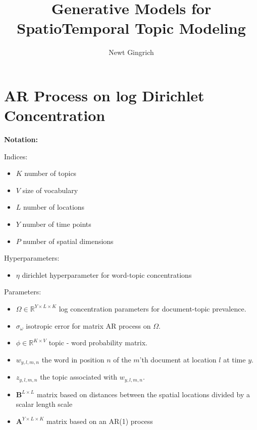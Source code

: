 \documentclass[a4paper]{article}
\title{Generative Models for SpatioTemporal Topic Modeling}
\author{Newt Gingrich}
\begin{document}
\maketitle

\section{AR Process on log Dirichlet Concentration}

\textbf{Notation:}

Indices:
\begin{itemize}
    \item $K$ number of topics
    \item $V$ size of vocabulary
    \item $L$ number of locations
    \item $Y$ number of time points
    \item $P$ number of spatial dimensions
\end{itemize}

Hyperparameters:
\begin{itemize}
    \item $\eta$ dirichlet hyperparameter for word-topic concentrations
\end{itemize}

Parameters:
\begin{itemize}
    \item $\Omega \in \mathbb{R}^{Y\times L\times K}$ log concentration parameters for document-topic prevalence.
    \item $\sigma_{\omega}$ isotropic error for matrix AR process on $\Omega$.
    \item $\phi \in \mathbb{R}^{K\times V}$ topic - word probability matrix.
    \item $w_{y,l,m,n}$ the word in position $n$ of the $m$'th document at location $l$ at time $y$.
    \item $z_{y,l,m,n}$ the topic associated with $w_{y,l,m,n}$.
    \item $\boldsymbol{B}^{L \times L}$ matrix based on distances between the spatial locations divided by a scalar length scale
    \item $\boldsymbol{A}^{Y \times L \times K}$ matrix based on an AR(1) process 
\end{itemize}
\end{document}
